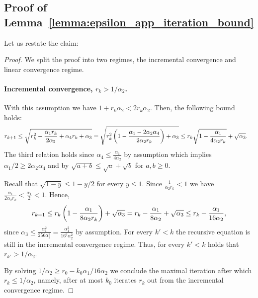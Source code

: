 \subsection{Proof of Lemma~\ref{lemma:epsilon_app_iteration_bound}}
Let us restate the claim:
\EpsilonIterationBound*
\begin{proof}
We split the proof into two regimes, the incremental convergence and linear convergence regime. 

 \paragraph{Incremental convergence, $r_k> 1/\alpha_2$.} With this assumption we have $1+r_k \alpha_2 < 2 r_k \alpha_2$. Then, the following bound holds:
 \begin{align*}
     r_{k+1} &\leq \sqrt{ r_k^2 -\frac{\alpha_1r_k}{2\alpha_2} + \alpha_4 r_k+\alpha_3}  = \sqrt{r_k^2 \left(1 -\frac{\alpha_1- 2\alpha_2\alpha_4}{2\alpha_2 r_k}\right) +\alpha_3} \leq r_k\sqrt{1-\frac{\alpha_1}{4\alpha_2 r_k}} + \sqrt{\alpha_3}.
 \end{align*}
 The third relation holds since $\alpha_4\leq \frac{\alpha_1}{4\alpha_2}$ by assumption which implies $\alpha_1/2\geq 2 \alpha_2 \alpha_4$ and by $\sqrt{a+b}\leq \sqrt{a}+\sqrt{b}$ for $a,b\geq 0$. 
 
 Recall that $\sqrt{1-y}\leq 1-y/2$ for every $y \leq 1$. Since $ \frac{1}{\alpha_2 r_k}<  1$ we have $ \frac{\alpha_1}{2\alpha_2 r_k}<  \frac{\alpha_1}{2} < 1$. %
 Hence,
\begin{align*}
    r_{k+1} \leq r_k\left(1-\frac{\alpha_1}{8\alpha_2 r_k}\right) +\sqrt{\alpha_3}= r_k - \frac{\alpha_1}{8\alpha_2} +\sqrt{\alpha_3} \leq r_k - \frac{\alpha_1}{16\alpha_2},
\end{align*}
since $\alpha_3 \leq \frac{\alpha_1^2}{256\alpha^2_2}= \frac{\alpha_1^2}{16^2\alpha^2_2} $ by assumption. For every $k'<k$ the recursive equation is still in the incremental convergence regime. Thus, for every $k'<k$ holds that $r_{k'}> 1/\alpha_2$.

By solving $1/\alpha_2 \geq r_0 - k_0\alpha_1/16\alpha_2$ we conclude the maximal iteration after which $r_k\leq 1/\alpha_2$, namely, after at most $k_0$ iterates $r_k$ out from the incremental convergence regime.


\end{proof}
